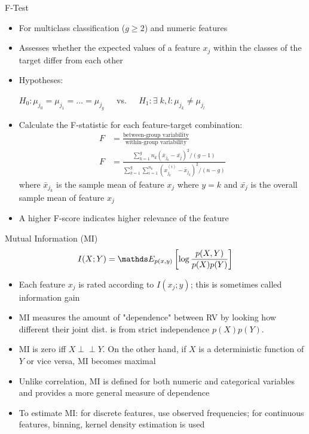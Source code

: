 \documentclass[11pt,compress,t,notes=noshow, xcolor=table]{beamer}
\begin{document}
  \begin{framev}{F-Test}
  \begin{itemize}
    \item For multiclass classification ($g \ge 2$) and numeric features
    \item Assesses whether the expected values of a feature $x_j$ within the classes of the target differ from each other
    \item Hypotheses:

    $H_0: \mu_{j_0} = \mu_{j_1} = \dots = \mu_{j_g} \;\;\;\;$ vs. $\;\;\;\;H_1 : \exists \; k,l: \mu_{j_k} \neq \mu_{j_l}$
    \item Calculate the F-statistic for each feature-target combination:
    \begin{align*}
    F &= \frac{\text{between-group variability}}{\text{within-group variability}}\\
    F &= \frac{\sum_{k = 1}^g n_k (\bar{x}_{j_k} - \bar{x_j})^2/(g-1)}{\sum_{k = 1}^g \sum_{i = 1}^{n_k} (x_{j_k}^{(i)} - \bar{x}_{j_k})^2/(n-g)}
    \end{align*}
    where $\bar{x}_{j_k}$ is the sample mean of feature $x_j$ where $y = k$ and $\bar{x_{j}}$ is the overall sample mean of feature $x_j$
  \item A higher F-score indicates higher relevance of the feature
  \end{itemize}
  \end{framev}

  \begin{framev}{Mutual Information (MI)}
  $$I(X ; Y) = \E_{p(x, y)} \left[ \log \frac{p(X, Y)}{p(X) p(Y)} \right]$$

  \begin{itemize}
  \setlength{\itemsep}{0.8em}
    \item Each feature $x_j$ is rated according to $I(x_j;y)$; this is sometimes called information gain
    \item MI measures the amount of "dependence" between RV by looking how
    different their joint dist. is from strict independence $p(X)p(Y)$.
    \item MI is zero iff $X \perp \!\!\! \perp Y$. On the other hand, if $X$ is a deterministic function of $Y$ or vice versa, MI becomes maximal
  \item Unlike correlation, MI is defined for both numeric and categorical variables and provides a more general measure of dependence
  \item To estimate MI: for discrete features, use observed frequencies; for continuous features, binning, kernel density estimation is used
  \end{itemize}
  \end{framev}

  \endlecture
\end{document}
